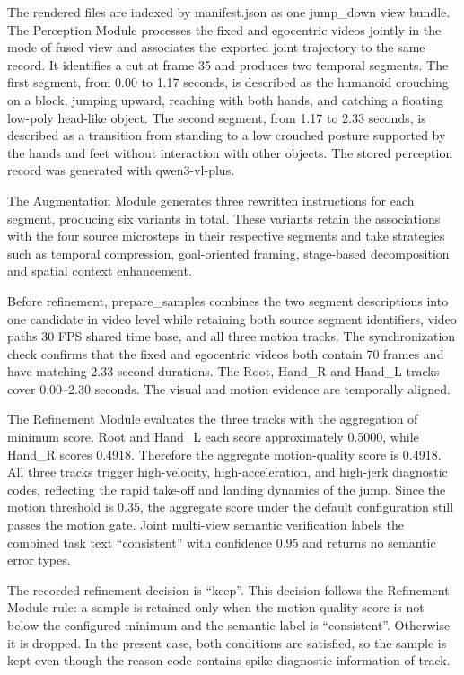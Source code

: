 \documentclass[11pt,oneside]{report}
\begin{document}
The rendered files are indexed by manifest.json as one jump\_down view bundle. The Perception Module processes the fixed and egocentric videos jointly in the mode of fused view and associates the exported joint trajectory to the same record. It identifies a cut at frame 35 and produces two temporal segments. The first segment, from 0.00 to 1.17 seconds, is described as the humanoid crouching on a block, jumping upward, reaching with both hands, and catching a floating low-poly head-like object. The second segment, from 1.17 to 2.33 seconds, is described as a transition from standing to a low crouched posture supported by the hands and feet without interaction with other objects. The stored perception record was generated with qwen3-vl-plus.

The Augmentation Module generates three rewritten instructions for each segment, producing six variants in total. These variants retain the associations with the four source microsteps in their respective segments and take strategies such as temporal compression, goal-oriented framing, stage-based decomposition and spatial context enhancement.

Before refinement, prepare\_samples combines the two segment descriptions into one candidate in video level while retaining both source segment identifiers, video paths 30 FPS shared time base, and all three motion tracks. The synchronization check confirms that the fixed and egocentric videos both contain 70 frames and have matching 2.33 second durations. The Root, Hand\_R and Hand\_L tracks cover 0.00–2.30 seconds. The visual and motion evidence are temporally aligned.

The Refinement Module evaluates the three tracks with the aggregation of minimum score. Root and Hand\_L each score approximately 0.5000, while Hand\_R scores 0.4918. Therefore the aggregate motion-quality score is 0.4918. All three tracks trigger high-velocity, high-acceleration, and high-jerk diagnostic codes, reflecting the rapid take-off and landing dynamics of the jump. Since the motion threshold is 0.35, the aggregate score under the default configuration still passes the motion gate. Joint multi-view semantic verification labels the combined task text “consistent” with confidence 0.95 and returns no semantic error types.

The recorded refinement decision is “keep”. This decision follows the Refinement Module rule: a sample is retained only when the motion-quality score is not below the configured minimum and the semantic label is “consistent”. Otherwise it is dropped. In the present case, both conditions are satisfied, so the sample is kept even though the reason code contains spike diagnostic information of track.
\end{document}
